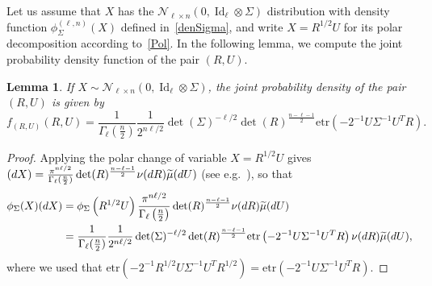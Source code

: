 \documentclass[10pt]{amsart}
\newtheorem{lemm}[theo]{Lemma}\newtheorem{prop}[theo]{Proposition}\newtheorem{coro}[theo]{Corollary}\newtheorem{conj}[theo]{Conjecture}
\theoremstyle{definition}\newtheorem{defi}[theo]{Definition}\newtheorem{rema}[theo]{Remark}\newtheorem{exam}[theo]{Example}\newtheorem{exem}[theo]{Example}\newtheorem{nota}[theo]{Notation}
\DeclareMathOperator{\Id}{Id}
\newcommand{\scN}{\mathscr{N}}
\newcommand{\etr}[1]{\mathrm{etr}\left(#1\right)}
\let\oldtilde\tilde
\renewcommand*{\tilde}[1]{\mathchoice{\widetilde{#1}}{\widetilde{#1}}{\oldtilde{#1}}{\oldtilde{#1}}}
\begin{document}
Let us assume that $X$ has the $\scN_{\ell \times n}(0,\Id_{\ell} \otimes \Sigma)$ distribution with density function $\phi_{\Sigma}^{(\ell,n)}(X)$ defined in~\eqref{denSigma}, and write $X=R^{1/2}U$ for its polar decomposition according to~\eqref{Pol}. In the following lemma, we compute the joint probability density function of the pair $(R,U)$.
\begin{lemm}
If $X \sim \scN_{\ell \times n}(0,\Id_{\ell} \otimes \Sigma)$, the joint probability density of the pair $(R,U)$ is given by
\begin{equation}\label{denMU}
f_{(R,U)}(R,U) = \frac{1}{\Gamma_{\ell}\left(\frac{n}{2}\right)}
\frac{1}{2^{n\ell/2}} \det(\Sigma)^{-\ell/2} \det(R)^{\frac{n-\ell-1}{2}}
\etr{ -2^{-1}U\Sigma^{-1}U^TR}.
\end{equation}
\end{lemm}

\begin{proof}
Applying the polar change of variable $X=R^{1/2}U$ gives $(dX) = \frac{\pi^{n\ell/2}}{\Gamma_{\ell}(\frac{n}{2})}\linebreak
\det(R)^{\frac{n-\ell-1}{2}} \nu(dR) \tilde{\mu}(dU)$ (see e.g.~\cite[Theorem~1.5.2]{Ch2012}), so that
\begin{align*}
\phi_{\Sigma}(X)(dX) &= \phi_{\Sigma}\left(R^{1/2}U\right) \frac{\pi^{n\ell/2}}{\Gamma_{\ell}\left(\frac{n}{2}\right)}
\det(R)^{\frac{n-\ell-1}{2}} \nu(dR) \tilde{\mu}(dU)\\
&= \frac{1}{\Gamma_{\ell}(\frac{n}{2})}
\frac{1}{2^{n\ell/2}} \det(\Sigma)^{-\ell/2} \det(R)^{\frac{n-\ell-1}{2}}
\etr{ -2^{-1}U\Sigma^{-1}U^TR}\nu(dR) \tilde{\mu}(dU),
\end{align*}
where we used that $\mathrm{etr}(-2^{-1}R^{1/2}U\Sigma^{-1}U^{T}R^{1/2})=\mathrm{etr}( -2^{-1}U\Sigma^{-1}U^TR)$.
\end{proof}
\end{document}
